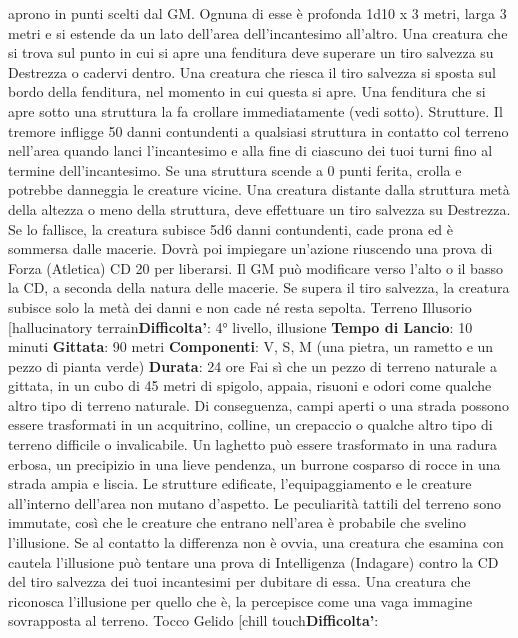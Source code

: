 \begin{multicols}{2}
aprono in punti scelti dal GM. Ognuna di esse è
profonda 1d10 x 3 metri, larga 3 metri e si estende da
un lato dell’area dell’incantesimo all’altro. Una creatura
che si trova sul punto in cui si apre una fenditura deve
superare un tiro salvezza su Destrezza o cadervi
dentro. Una creatura che riesca il tiro salvezza si sposta
sul bordo della fenditura, nel momento in cui questa si
apre.
Una fenditura che si apre sotto una struttura la fa
crollare immediatamente (vedi sotto).
Strutture. Il tremore infligge 50 danni contundenti a
qualsiasi struttura in contatto col terreno nell’area
quando lanci l’incantesimo e alla fine di ciascuno dei
tuoi turni fino al termine dell’incantesimo. Se una
struttura scende a 0 punti ferita, crolla e potrebbe
danneggia le creature vicine. Una creatura distante
dalla struttura metà della altezza o meno della struttura,
deve effettuare un tiro salvezza su Destrezza. Se lo
fallisce, la creatura subisce 5d6 danni contundenti,
cade prona ed è sommersa dalle macerie. Dovrà poi
impiegare un’azione riuscendo una prova di Forza
(Atletica) CD 20 per liberarsi. Il GM può modificare
verso l’alto o il basso la CD, a seconda della natura
delle macerie. Se supera il tiro salvezza, la creatura
subisce solo la metà dei danni e non cade né resta
sepolta.
Terreno Illusorio
[hallucinatory terrain\textbf{Difficolta'}:
4° livello, illusione
\textbf{Tempo di Lancio}: 10 minuti
\textbf{Gittata}: 90 metri
\textbf{Componenti}: V, S, M (una pietra, un rametto e un
pezzo di pianta verde)
\textbf{Durata}: 24 ore
Fai sì che un pezzo di terreno naturale a gittata, in un
cubo di 45 metri di spigolo, appaia, risuoni e odori come
qualche altro tipo di terreno naturale. Di conseguenza,
campi aperti o una strada possono essere trasformati in
un acquitrino, colline, un crepaccio o qualche altro tipo
di terreno difficile o invalicabile. Un laghetto può essere
trasformato in una radura erbosa, un precipizio in una
lieve pendenza, un burrone cosparso di rocce in una
strada ampia e liscia. Le strutture edificate,
l’equipaggiamento e le creature all’interno dell’area non
mutano d’aspetto.
Le peculiarità tattili del terreno sono immutate, così che
le creature che entrano nell’area è probabile che
svelino l’illusione. Se al contatto la differenza non è
ovvia, una creatura che esamina con cautela l’illusione
può tentare una prova di Intelligenza (Indagare) contro
la CD del tiro salvezza dei tuoi incantesimi per dubitare
di essa. Una creatura che riconosca l’illusione per
quello che è, la percepisce come una vaga immagine
sovrapposta al terreno.
Tocco Gelido
[chill touch\textbf{Difficolta'}:

\end{multicols}
